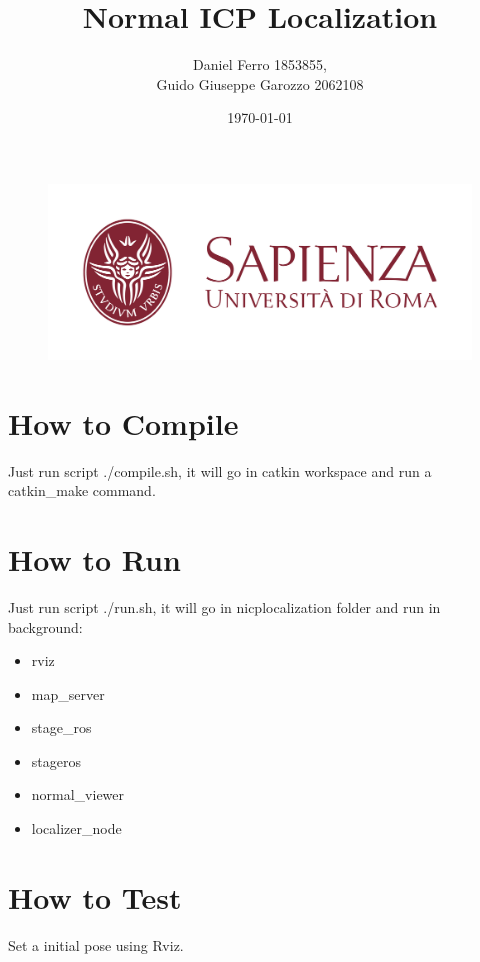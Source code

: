 \documentclass[]{article}  %
\title{\textbf{Normal ICP Localization}}
\author{\LARGE Daniel Ferro 1853855,\\ \LARGE \indent Guido Giuseppe Garozzo 2062108}
\date{}
\date{\vspace{15ex}\Large \today}
\begin{document}
\begin{figure}[t]
    \includegraphics[width=1\textwidth, height=0.3\textheight]{logo_Sapienza_rgb.png}
    \centering
  \end{figure}
\maketitle
\clearpage


\renewcommand*\contentsname{Indici}
\tableofcontents
\clearpage

\section{How to Compile}
\Large
Just run script  ./compile.sh, it will go in catkin workspace and run a catkin\_make command.
\section{How to Run}
Just run script  ./run.sh, it will go in nicp\textunderscore localization folder and run in background:

\begin{itemize}
    \item rviz 
    \item map\_server
    \item stage\_ros
    \item stageros
    \item normal\_viewer
    \item localizer\_node
\end{itemize}

\section{How to Test}
Set a initial pose using Rviz.
\end{document}
